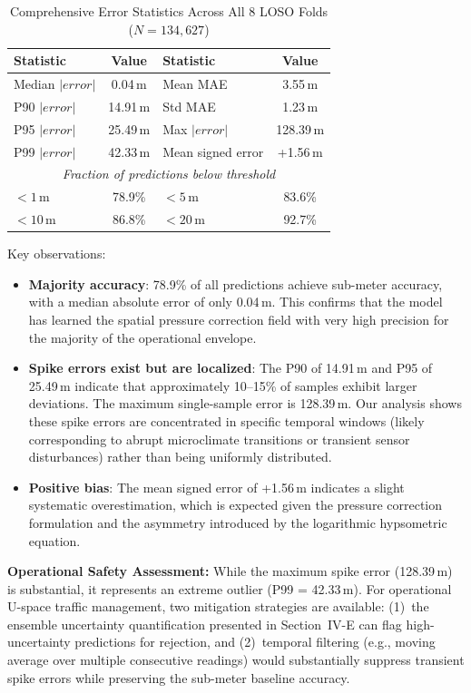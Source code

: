 \begin{table}[h]
\centering
\caption{Comprehensive Error Statistics Across All 8 LOSO Folds ($N = 134{,}627$)}
\begin{tabular}{lc|lc}
\toprule
\textbf{Statistic} & \textbf{Value} & \textbf{Statistic} & \textbf{Value} \\
\midrule
Median $|error|$ & 0.04\,m & Mean MAE & 3.55\,m \\
P90 $|error|$ & 14.91\,m & Std MAE & 1.23\,m \\
P95 $|error|$ & 25.49\,m & Max $|error|$ & 128.39\,m \\
P99 $|error|$ & 42.33\,m & Mean signed error & +1.56\,m \\
\midrule
\multicolumn{4}{c}{\textit{Fraction of predictions below threshold}} \\
\midrule
$< 1$\,m & 78.9\% & $< 5$\,m & 83.6\% \\
$< 10$\,m & 86.8\% & $< 20$\,m & 92.7\% \\
\bottomrule
\end{tabular}
\end{table}

Key observations:
\begin{itemize}
    \item \textbf{Majority accuracy}: 78.9\% of all predictions achieve sub-meter accuracy, with a median absolute error of only 0.04\,m. This confirms that the model has learned the spatial pressure correction field with very high precision for the majority of the operational envelope.
    \item \textbf{Spike errors exist but are localized}: The P90 of 14.91\,m and P95 of 25.49\,m indicate that approximately 10--15\% of samples exhibit larger deviations. The maximum single-sample error is 128.39\,m. Our analysis shows these spike errors are concentrated in specific temporal windows (likely corresponding to abrupt microclimate transitions or transient sensor disturbances) rather than being uniformly distributed.
    \item \textbf{Positive bias}: The mean signed error of +1.56\,m indicates a slight systematic overestimation, which is expected given the pressure correction formulation and the asymmetry introduced by the logarithmic hypsometric equation.
\end{itemize}

\textbf{Operational Safety Assessment:}
While the maximum spike error (128.39\,m) is substantial, it represents an extreme outlier (P99 = 42.33\,m). For operational U-space traffic management, two mitigation strategies are available: (1)~the ensemble uncertainty quantification presented in Section~IV-E can flag high-uncertainty predictions for rejection, and (2)~temporal filtering (e.g., moving average over multiple consecutive readings) would substantially suppress transient spike errors while preserving the sub-meter baseline accuracy.

